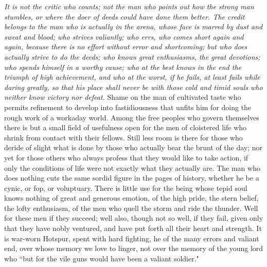 \documentclass{scrbook}
\begin{document}
{
\em
It is not the critic who counts; not the man who points out how the strong man stumbles,
or where the doer of deeds could have done them better. The credit belongs to the man who
is actually in the arena, whose face is marred by dust and sweat and blood; who strives
valiantly; who errs, who comes short again and again, because there is no effort without
error and shortcoming; but who does actually strive to do the deeds; who knows great
enthusiasms, the great devotions; who spends himself in a worthy cause; who at the best
knows in the end the triumph of high achievement, and who at the worst, if he fails, at least
fails while daring greatly, so that his place shall never be with those cold and timid souls
who neither know victory nor defeat. 
}
Shame on the man of cultivated taste who permits
refinement to develop into fastidiousness that unfits him for doing the rough work of a
workaday world. Among the free peoples who govern themselves there is but a small field
of usefulness open for the men of cloistered life who shrink from contact with their fellows.
Still less room is there for those who deride of slight what is done by those who actually
bear the brunt of the day; nor yet for those others who always profess that they would like
to take action, if only the conditions of life were not exactly what they actually are. The
man who does nothing cuts the same sordid figure in the pages of history, whether he be a
cynic, or fop, or voluptuary. There is little use for the being whose tepid soul knows nothing
of great and generous emotion, of the high pride, the stern belief, the lofty enthusiasm, of
the men who quell the storm and ride the thunder. Well for these men if they succeed; well
also, though not so well, if they fail, given only that they have nobly ventured, and have put
forth all their heart and strength. It is war-worn Hotspur, spent with hard fighting, he of the
many errors and valiant end, over whose memory we love to linger, not over the memory of
the young lord who ``but for the vile guns would have been a valiant soldier."
\end{document}
